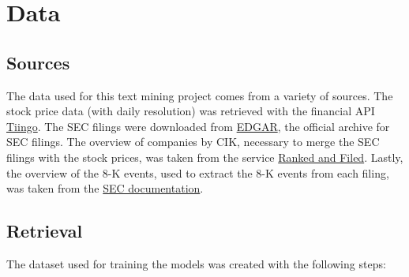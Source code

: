 \documentclass{article}
\begin{document}
	\section{Data}
	
	\subsection{Sources}
	
	The data used for this text mining project comes from a variety of sources. The stock price data (with daily resolution) was retrieved with the financial API \href{https://www.tiingo.com}{Tiingo}. The SEC filings were downloaded from \href{https://www.sec.gov/Archives/edgar/full-index/}{EDGAR}, the official archive for SEC filings. The overview of companies by CIK, necessary to merge the SEC filings with the stock prices, was taken from the service \href{http://rankandfiled.com/#/data/tickers}{Ranked and Filed}. Lastly, the overview of the 8-K events, used to extract the 8-K events from each filing, was taken from the  \href{https://www.sec.gov/fast-answers/answersform8khtm.html}{SEC documentation}. 
	
	\subsection{Retrieval}
	
	The dataset used for training the models was created with the following steps: 
	
\end{document}
